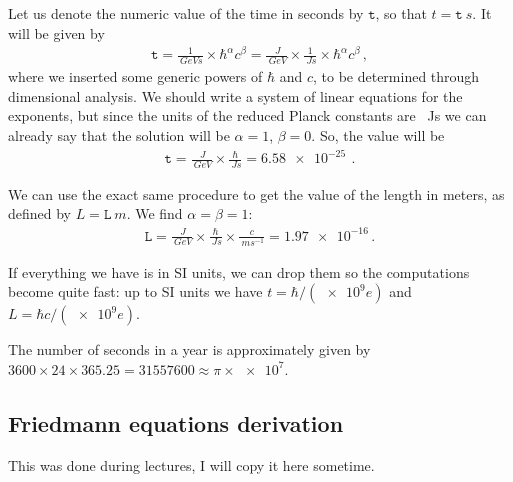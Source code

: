 \documentclass[main.tex]{subfiles}
\begin{document}
Let us denote the numeric value of the time in seconds by \(\mathtt{t}\), so that \(t = \mathtt{t} \SI{}{s}\). It will be given by 
%
\begin{align}
\mathtt{t} = \frac{1}{\SI{}{GeV s}} \times \hbar^{\alpha } c^{\beta } = \frac{\SI{}{J}}{\SI{}{GeV}} \times \frac{1}{\SI{}{Js}} \times \hbar^{\alpha } c^{\beta }  
\,,
\end{align}
%
where we inserted some generic powers of \(\hbar\) and \(c\), to be determined through dimensional analysis.
We should write a system of linear equations for the exponents, but since the units of the reduced Planck constants are \SI{}{Js} we can already say that the solution will be \(\alpha = 1\), \(\beta =0\). 
So, the value will be 
%
\begin{align}
\mathtt{t}  = \frac{\SI{}{J}}{\SI{}{GeV}} \times \frac{\hbar}{\SI{}{Js}} = \SI{6.58e-25}{}
\,.
\end{align}

We can use the exact same procedure to get the value of the length in meters, as defined by \(L = \mathtt{L} \SI{}{m}\). We find \(\alpha = \beta = 1\): 
%
\begin{align}
\mathtt{L} = \frac{\SI{}{J}}{\SI{}{GeV}} 
\times \frac{\hbar}{\SI{}{Js}} \times \frac{c }{\SI{}{m s^{-1}}} = \num{1.97e-16}
\,.
\end{align}

If everything we have is in SI units, we can drop them so the computations become quite fast: up to SI units we have \(t  = \hbar / (\num{e9}e) \) and \(L = \hbar c / (\num{e9} e)\).

The number of seconds in a year is approximately given by \(3600 \times 24 \times 365.25 = 31557600 \approx \pi \times \num{e7}\).

\subsection{Friedmann equations derivation}

This was done during lectures, I will copy it here sometime. 
\end{document}
